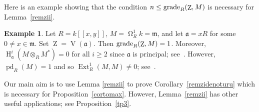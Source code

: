 \documentclass[11pt]{amsart}
\theoremstyle{definition}
\theoremstyle{definition}
\newtheorem{eg}[thm]{Example}
\numberwithin{equation}{section}
\newcommand{\fm}{\mathfrak{m}}
\newcommand{\fa}{\mathfrak{a}}
\DeclareMathOperator{\gr}{\textnormal{grade}}
\DeclareMathOperator{\V}{V}
\DeclareMathOperator{\mz}{Z}
\DeclareMathOperator{\Ext}{Ext}
\DeclareMathOperator{\hh}{H}
\DeclareMathOperator{\pd}{pd}
\DeclareMathOperator{\Syz}{\Omega}
\begin{document}
Here is an example showing that the condition $n\leq\gr_R(\mz,M)$ is necessary for Lemma~\ref{remzii}.

\begin{eg} Let $R=k[\![x,y]\!]$, $M=\Syz_R^1k=\fm$, and let $\fa=xR$ for some $0\neq x \in \fm$. Set $\mz=\V(\fa)$. Then $\gr_R(\mz,M)=1$. Moreover, $\hh^i_{\fa}(M\otimes_RM^*)=0$ for all $i\geq 2$ since $\fa$ is principal; see~\cite[3.3.1]{Bsh}. However, $\pd_R(M)=1$ and so $\Ext^{1}_R(M,M)\neq 0$; see~\cite[Lemma 1(iii), page 154]{Mat}.
\end{eg}

Our main aim is to use Lemma \ref{remzii} to prove Corollary~\ref{remzidenoturu} which is necessary for Proposition~\ref{cortomax}. However, Lemma~\ref{remzii} has other useful applications; see Proposition~\ref{tp3}. 
\end{document}
